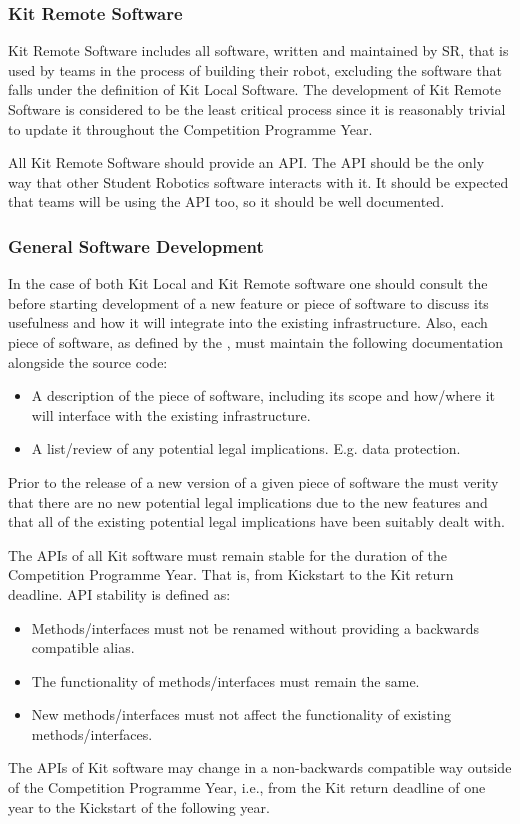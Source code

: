 \begin{draft}
\subsubsection{Kit Remote Software}
Kit Remote Software includes all software, written and maintained by SR, that is used by teams in the process of building their robot, excluding the software that falls under the definition of Kit Local Software. The development of Kit Remote Software is considered to be the least critical process since it is reasonably trivial to update it throughout the Competition Programme Year.

All Kit Remote Software should provide an API. The API should be the only way that other Student Robotics software interacts with it. It should be expected that teams will be using the API too, so it should be well documented.

\subsubsection{General Software Development}
In the case of both Kit Local and Kit Remote software one should consult the  before starting development of a new feature or piece of software to discuss its usefulness and how it will integrate into the existing infrastructure. Also, each piece of software, as defined by the , must maintain the following documentation alongside the source code:
\begin{itemize}
  \item A description of the piece of software, including its scope and how/where it will interface with the existing infrastructure.
  \item A list/review of any potential legal implications. E.g. data protection.
\end{itemize}
Prior to the release of a new version of a given piece of software the  must verity that there are no new potential legal implications due to the new features and that all of the existing potential legal implications have been suitably dealt with.

The APIs of all Kit software must remain stable for the duration of the Competition Programme Year. That is, from Kickstart to the Kit return deadline. API stability is defined as:
\begin{itemize}
  \item Methods/interfaces must not be renamed without providing a backwards compatible alias.
  \item The functionality of methods/interfaces must remain the same.
  \item New methods/interfaces must not affect the functionality of existing methods/interfaces.
\end{itemize}
The APIs of Kit software may change in a non-backwards compatible way outside of the Competition Programme Year, i.e., from the Kit return deadline of one year to the Kickstart of the following year.


\end{draft}
